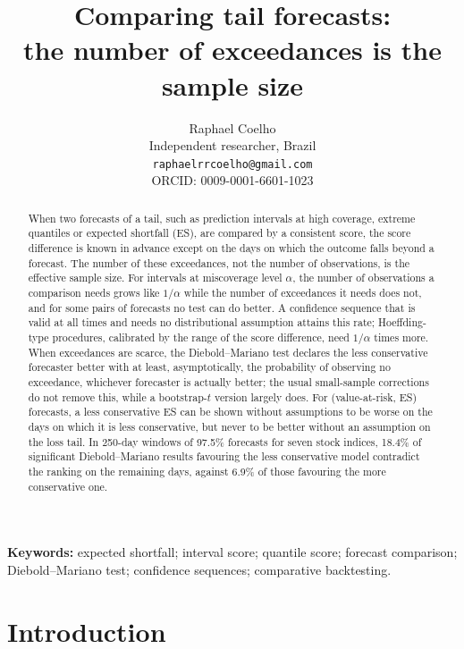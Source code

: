 \documentclass[11pt]{article}
\title{Comparing tail forecasts:\\the number of exceedances is the sample size}
\author{Raphael Coelho\\ Independent researcher, Brazil\\
\texttt{raphaelrrcoelho@gmail.com}\\ ORCID: 0009-0001-6601-1023}
\date{}
\theoremstyle{remark}
\theoremstyle{definition}
\begin{document}
\maketitle

\begin{abstract}
When two forecasts of a tail, such as prediction intervals at high
coverage, extreme quantiles or expected shortfall (ES), are compared by a
consistent score, the score difference is known in advance except on the
days on which the outcome falls beyond a forecast. The number of these
exceedances, not the number of observations, is the effective sample size.
For intervals at miscoverage level $\alpha$, the number of observations a
comparison needs grows like $1/\alpha$ while the number of exceedances it
needs does not, and for some pairs of forecasts no test can do better. A
confidence sequence that is valid at all times and needs no distributional
assumption attains this rate; Hoeffding-type procedures, calibrated by the
range of the score difference, need $1/\alpha$ times more. When
exceedances are scarce, the Diebold--Mariano test declares the less
conservative forecaster better with at least, asymptotically, the
probability of observing no exceedance, whichever forecaster is actually
better; the usual small-sample corrections do not remove this, while a
bootstrap-$t$ version largely does. For (value-at-risk, ES) forecasts, a
less conservative ES can be shown without assumptions to be worse on the
days on which it is less conservative, but never to be better without an
assumption on the loss tail. In 250-day windows of 97.5\% forecasts for
seven stock indices, 18.4\% of significant Diebold--Mariano results
favouring the less conservative model contradict the ranking on the
remaining days, against 6.9\% of those favouring the more conservative
one.
\end{abstract}

\noindent\textbf{Keywords:} expected shortfall; interval score; quantile score;
forecast comparison; Diebold--Mariano test; confidence sequences; comparative
backtesting.

\section{Introduction}
\label{sec:intro}
\end{document}
